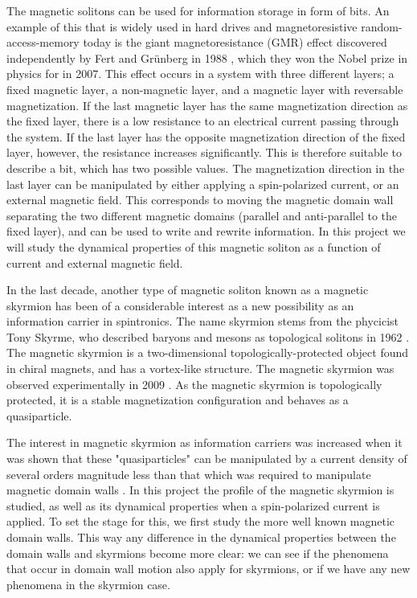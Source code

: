 \documentclass[12pt, a4paper, twoside, openright]{article}		%
\numberwithin{equation}{section}
\begin{document}
The magnetic solitons can be used for information storage in form of bits. An example of this that is widely used in hard drives and magnetoresistive random-access-memory today is the giant magnetoresistance (GMR) effect discovered independently by Fert and Gr\"{u}nberg in 1988 \cite{Fert1988} \cite{Grunberg1989}, which they won the Nobel prize in physics for in 2007. This effect occurs in a system with three different layers; a fixed magnetic layer, a non-magnetic layer, and a magnetic layer with reversable magnetization. If the last magnetic layer has the same magnetization direction as the fixed layer, there is a low resistance to an electrical current passing through the system. If the last layer has the opposite magnetization direction of the fixed layer, however, the resistance increases significantly. This is therefore suitable to describe a bit, which has two possible values. The magnetization direction in the last layer can be manipulated by either applying a spin-polarized current, or an external magnetic field. This corresponds to moving the magnetic domain wall separating the two different magnetic domains (parallel and anti-parallel to the fixed layer), and can be used to write and rewrite information. In this project we will study the dynamical properties of this magnetic soliton as a function of current and external magnetic field.

In the last decade, another type of magnetic soliton known as a magnetic skyrmion has been of a considerable interest as a new possibility as an information carrier in spintronics. The name skyrmion stems from the phycicist Tony Skyrme, who described baryons and mesons as topological solitons in 1962 \cite{Skyrme1962}. The magnetic skyrmion is a two-dimensional topologically-protected object found in chiral magnets, and has a vortex-like structure. The magnetic skyrmion was observed experimentally in 2009 \cite{Muhlbauer2009}. As the magnetic skyrmion is topologically protected, it is a stable magnetization configuration and behaves as a quasiparticle. 

The interest in magnetic skyrmion as information carriers was increased when it was shown that these "quasiparticles" can be manipulated by a current density of several orders magnitude less than that which was required to manipulate magnetic domain walls \cite{Jonietz2010}. In this project the profile of the magnetic skyrmion is studied, as well as its dynamical properties when a spin-polarized current is applied. To set the stage for this, we first study the more well known magnetic domain walls. This way any difference in the dynamical properties between the domain walls and skyrmions become more clear: we can see if the phenomena that occur in domain wall motion also apply for skyrmions, or if we have any new phenomena in the skyrmion case.
\end{document}
